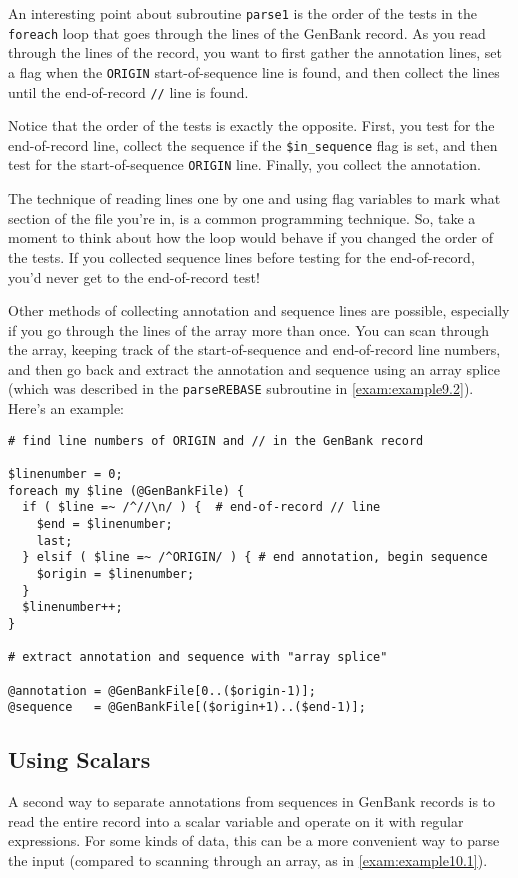 An interesting point about subroutine \verb|parse1| is the order of the tests in the \verb|foreach| loop that goes through the lines of the GenBank record. As you read through the lines of the record, you want to first gather the annotation lines, set a flag when the \verb|ORIGIN| start-of-sequence line is found, and then collect the lines until the end-of-record \verb|//| line is found.

Notice that the order of the tests is exactly the opposite. First, you test for the end-of-record line, collect the sequence if the \verb|$in_sequence| flag is set, and then test for the start-of-sequence \verb|ORIGIN| line. Finally, you collect the annotation.

The technique of reading lines one by one and using flag variables to mark what section of the file you're in, is a common programming technique. So, take a moment to think about how the loop would behave if you changed the order of the tests. If you collected sequence lines before testing for the end-of-record, you'd never get to the end-of-record test!

Other methods of collecting annotation and sequence lines are possible, especially if you go through the lines of the array more than once. You can scan through the array, keeping track of the start-of-sequence and end-of-record line numbers, and then go back and extract the annotation and sequence using an array splice (which was described in the \verb|parseREBASE| subroutine in \autoref{exam:example9.2}). Here's an example:

\begin{lstlisting}
# find line numbers of ORIGIN and // in the GenBank record

$linenumber = 0;
foreach my $line (@GenBankFile) {
  if ( $line =~ /^//\n/ ) {  # end-of-record // line
    $end = $linenumber;
    last;
  } elsif ( $line =~ /^ORIGIN/ ) { # end annotation, begin sequence
    $origin = $linenumber;
  }
  $linenumber++;
}

# extract annotation and sequence with "array splice"

@annotation = @GenBankFile[0..($origin-1)];
@sequence   = @GenBankFile[($origin+1)..($end-1)];
\end{lstlisting}

\subsection{Using Scalars}
A second way to separate annotations from sequences in GenBank records is to read the entire record into a scalar variable and operate on it with regular expressions. For some kinds of data, this can be a more convenient way to parse the input (compared to scanning through an array, as in \autoref{exam:example10.1}).


